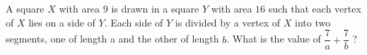 A square $X$ with area $9$ is drawn in a square $Y$ with area $16$ such that each vertex of $X$ lies on a side of $Y$. Each side of $Y$ is divided by a vertex of $X$ into two segments, one of length a and the other of length $b$. What is the value of $\dfrac{7}{a} +  \dfrac{7}{b}$ ?
